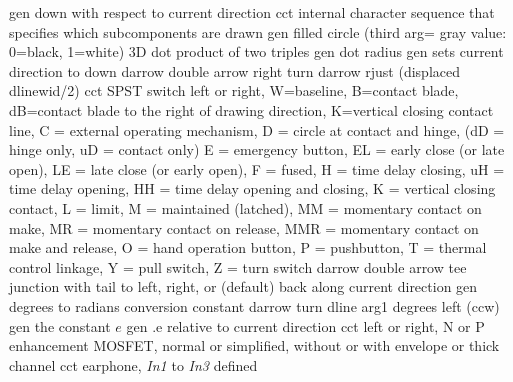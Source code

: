  {gen}
  {down with respect to current direction}
  {cct}
  {internal character sequence that specifies which subcomponents are drawn}
  {gen}
  {filled circle (third arg= gray value: 0=black, 1=white)}
  {3D}
  {dot product of two triples}
  {gen}
  {dot radius}
  {gen}
  {sets current direction to down }
  {darrow}
  {double arrow right turn}
  {darrow}
  {rjust (displaced dlinewid/2)}
  {cct}
  {SPST switch left or right, W=baseline, B=contact blade,
    dB=contact blade to the right of drawing direction,
         K=vertical closing contact line,
         C = external operating mechanism,
         D = circle at contact and hinge,
             (dD = hinge only, uD = contact only)
         E = emergency button,
         EL = early close
            (or late open),
         LE = late close (or early open),
         F = fused,
         H = time delay closing,
         uH = time delay opening,
         HH = time delay
             opening and closing,
         K = vertical closing contact,
         L = limit,
         M = maintained (latched),
         MM = momentary contact on make,
         MR = momentary contact on release,
         MMR = momentary contact
            on make and release,
         O = hand operation button,
         P = pushbutton,
         T = thermal control linkage,
         Y = pull switch,
         Z = turn switch
   }
  {darrow}
  {double arrow tee junction with tail to left,
   right, or (default) back along current direction }
  {gen}
  {degrees to radians conversion constant}
  {darrow}
  {turn dline arg1 degrees left (ccw)}
  {gen}
  {the constant $e$}
  {gen}
  {.e relative to current direction}
  {cct}
  {left or right, N or P enhancement MOSFET, normal
   or simplified, without or with envelope or thick channel 
    }
  {cct}
  {earphone, {\sl In1} to {\sl In3} defined
   }
